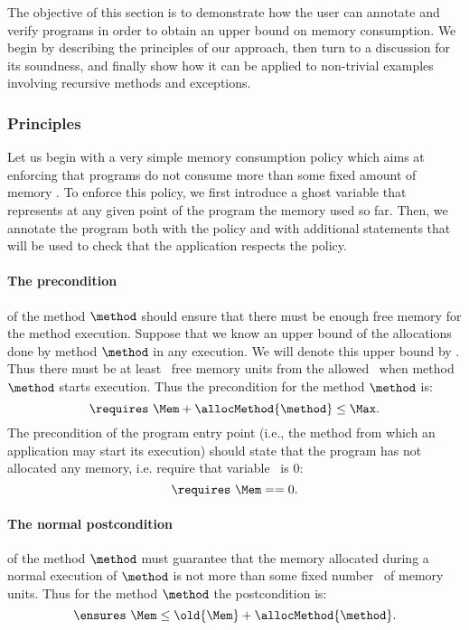 The objective of this section is to demonstrate how the user can
annotate and verify programs in order to obtain an upper bound on
memory consumption. We begin by describing the principles of our
approach, then turn to a discussion for its soundness, and finally show
how it can be applied to non-trivial examples involving recursive
methods and exceptions.


\subsubsection{Principles}
Let us begin with a very simple memory consumption policy which aims
at enforcing that  programs do not consume more than
some fixed amount of memory \Max . To enforce this policy, we first
introduce a ghost variable \Mem{} that represents at any given point of
the program the memory used so far. Then, we annotate the program both
with the policy and with additional statements that will be used to
check that the application respects the policy.



\paragraph{The precondition} of the method $\method$ should ensure that
there must be enough free memory for the method execution. Suppose
that we know an upper bound of the allocations done by method $\method$
in any execution. We will denote this upper bound by
\allocMethod{\method}. Thus there must be at least
\allocMethod{\method}\ free memory units from the allowed \Max\ when
method $\method$ starts execution. Thus the precondition for the method
$\method$ is:
$$
\requires \ \Mem + \allocMethod{\method}  \leq \Max.
$$
The precondition of the
program entry point (i.e., the method from which an application
may start its execution) should state that the program has not
allocated any memory, i.e. require that variable \Mem \ is  0:
$$
\requires \ \Mem == 0.
$$
\paragraph{The normal postcondition} of the method $\method$ must
guarantee that the memory allocated during a normal execution of
$\method$ is not more than some fixed number \allocMethod{\method}\
of memory units. Thus for the method $\method$ the postcondition is:
$$
\ensures \  \Mem \leq \old{\Mem} + \allocMethod{\method}.
$$

